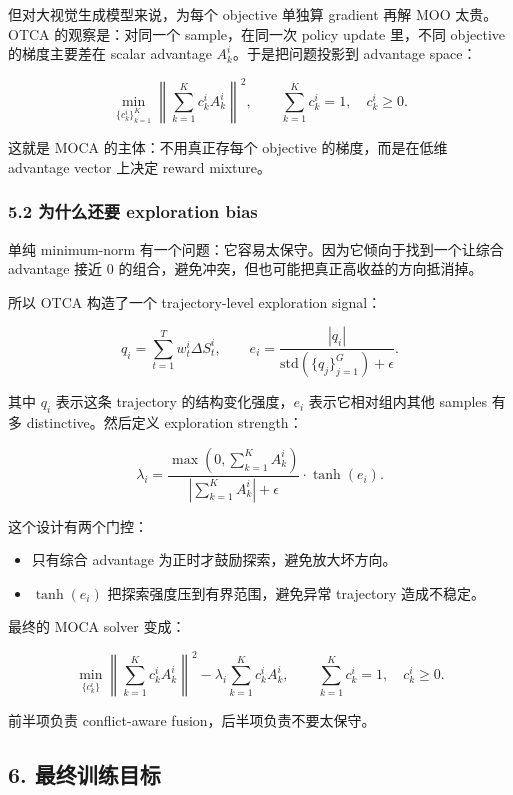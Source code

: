 但对大视觉生成模型来说，为每个 objective 单独算 gradient 再解 MOO 太贵。OTCA 的观察是：对同一个 sample，在同一次 policy update 里，不同 objective 的梯度主要差在 scalar advantage \(A_k^i\)。于是把问题投影到 advantage space：

\[
\min_{\{c_k^i\}_{k=1}^{K}}
\left\|
\sum_{k=1}^{K}
c_k^i A_k^i
\right\|^2,
\qquad
\sum_{k=1}^{K}c_k^i=1,\quad c_k^i\ge 0.
\]

这就是 MOCA 的主体：不用真正存每个 objective 的梯度，而是在低维 advantage vector 上决定 reward mixture。

\subsubsection{5.2 为什么还要 exploration bias}

单纯 minimum-norm 有一个问题：它容易太保守。因为它倾向于找到一个让综合 advantage 接近 0 的组合，避免冲突，但也可能把真正高收益的方向抵消掉。

所以 OTCA 构造了一个 trajectory-level exploration signal：

\[
q_i
=
\sum_{t=1}^{T} w_t^i \Delta S_t^i,
\qquad
e_i
=
\frac{
|q_i|
}{
\mathrm{std}(\{q_j\}_{j=1}^{G})+\epsilon
}.
\]

其中 \(q_i\) 表示这条 trajectory 的结构变化强度，\(e_i\) 表示它相对组内其他 samples 有多 distinctive。然后定义 exploration strength：

\[
\lambda_i
=
\frac{
\max\left(0,\sum_{k=1}^{K} A_k^i\right)
}{
\left|\sum_{k=1}^{K} A_k^i\right|+\epsilon
}
\cdot
\tanh(e_i).
\]

这个设计有两个门控：

\begin{itemize}[leftmargin=1.5em]
  \item 只有综合 advantage 为正时才鼓励探索，避免放大坏方向。
  \item \(\tanh(e_i)\) 把探索强度压到有界范围，避免异常 trajectory 造成不稳定。
\end{itemize}

最终的 MOCA solver 变成：

\[
\min_{\{c_k^i\}}
\left\|
\sum_{k=1}^{K} c_k^i A_k^i
\right\|^2
-
\lambda_i
\sum_{k=1}^{K} c_k^i A_k^i,
\qquad
\sum_{k=1}^{K}c_k^i=1,\quad c_k^i\ge 0.
\]

前半项负责 conflict-aware fusion，后半项负责不要太保守。

\subsection{6. 最终训练目标}

